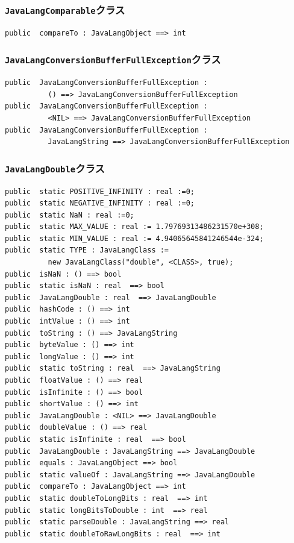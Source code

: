 \documentclass[\pformat,12pt]{jarticle}
\begin{document}
\subsubsection{\texttt{JavaLangComparable}クラス}
\begin{small}
\begin{verbatim}
public  compareTo : JavaLangObject ==> int

\end{verbatim}
\end{small}

\subsubsection{\texttt{JavaLangConversionBufferFullException}クラス}
\begin{small}
\begin{verbatim}
public  JavaLangConversionBufferFullException : 
          () ==> JavaLangConversionBufferFullException
public  JavaLangConversionBufferFullException : 
          <NIL> ==> JavaLangConversionBufferFullException
public  JavaLangConversionBufferFullException : 
          JavaLangString ==> JavaLangConversionBufferFullException
\end{verbatim}
\end{small}

\subsubsection{\texttt{JavaLangDouble}クラス}
\begin{small}
\begin{verbatim}
public  static POSITIVE_INFINITY : real :=0;
public  static NEGATIVE_INFINITY : real :=0;
public  static NaN : real :=0;
public  static MAX_VALUE : real := 1.79769313486231570e+308;
public  static MIN_VALUE : real := 4.94065645841246544e-324;
public  static TYPE : JavaLangClass := 
          new JavaLangClass("double", <CLASS>, true);
public  isNaN : () ==> bool
public  static isNaN : real  ==> bool
public  JavaLangDouble : real  ==> JavaLangDouble
public  hashCode : () ==> int
public  intValue : () ==> int
public  toString : () ==> JavaLangString
public  byteValue : () ==> int
public  longValue : () ==> int
public  static toString : real  ==> JavaLangString
public  floatValue : () ==> real
public  isInfinite : () ==> bool
public  shortValue : () ==> int
public  JavaLangDouble : <NIL> ==> JavaLangDouble
public  doubleValue : () ==> real
public  static isInfinite : real  ==> bool
public  JavaLangDouble : JavaLangString ==> JavaLangDouble
public  equals : JavaLangObject ==> bool
public  static valueOf : JavaLangString ==> JavaLangDouble
public  compareTo : JavaLangObject ==> int
public  static doubleToLongBits : real  ==> int
public  static longBitsToDouble : int  ==> real
public  static parseDouble : JavaLangString ==> real
public  static doubleToRawLongBits : real  ==> int
\end{verbatim}
\end{small}
\end{document}
